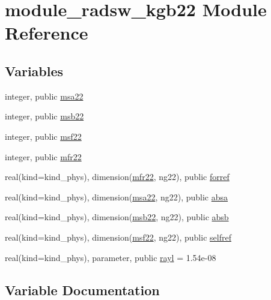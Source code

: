 \hypertarget{namespacemodule__radsw__kgb22}{}\section{module\+\_\+radsw\+\_\+kgb22 Module Reference}
\label{namespacemodule__radsw__kgb22}
\subsection*{Variables}
\begin{DoxyCompactItemize}
\item 
integer, public \hyperlink{namespacemodule__radsw__kgb22_a4134c2cd3b31db5e0adb5c3c2ad87905}{msa22}
\item 
integer, public \hyperlink{group__module__radsw__main_ga3398f8d12ec0349b44197873ac58fd98}{msb22}
\item 
integer, public \hyperlink{group__module__radsw__main_ga0903a020c9e4a4f7c21911d2ab98fd46}{msf22}
\item 
integer, public \hyperlink{group__module__radsw__main_ga0afe8facbe4837a22c96a0d2000a20ee}{mfr22}
\item 
real(kind=kind\+\_\+phys), dimension(\hyperlink{group__module__radsw__main_ga0afe8facbe4837a22c96a0d2000a20ee}{mfr22}, ng22), public \hyperlink{group__module__radsw__main_ga509916fac772945555a1b3fd0d002c93}{forref}
\item 
real(kind=kind\+\_\+phys), dimension(\hyperlink{namespacemodule__radsw__kgb22_a4134c2cd3b31db5e0adb5c3c2ad87905}{msa22}, ng22), public \hyperlink{group__module__radsw__main_ga15ed79e7136ed6d7f11c19a81281af53}{absa}
\item 
real(kind=kind\+\_\+phys), dimension(\hyperlink{group__module__radsw__main_ga3398f8d12ec0349b44197873ac58fd98}{msb22}, ng22), public \hyperlink{group__module__radsw__main_ga60403e7d343c85e965f3507b0db0f2a5}{absb}
\item 
real(kind=kind\+\_\+phys), dimension(\hyperlink{group__module__radsw__main_ga0903a020c9e4a4f7c21911d2ab98fd46}{msf22}, ng22), public \hyperlink{group__module__radsw__main_gabc3bd99e8ad7d1f09fb7fab7ed67a32b}{selfref}
\item 
real(kind=kind\+\_\+phys), parameter, public \hyperlink{group__module__radsw__main_gae77b766677ea476e2ba14b88e511870a}{rayl} = 1.\+54e-\/08
\end{DoxyCompactItemize}


\subsection{Variable Documentation}
